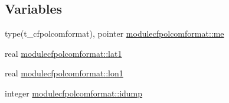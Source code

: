 \subsection*{Variables}
\begin{DoxyCompactItemize}
\item 
type(t\+\_\+cfpolcomformat), pointer \mbox{\hyperlink{namespacemodulecfpolcomformat_acc4b6f01dd43793f860ce27c79504f03}{modulecfpolcomformat\+::me}}
\item 
real \mbox{\hyperlink{namespacemodulecfpolcomformat_a85fafebe9ec21f0fc121f3b22fa92f9f}{modulecfpolcomformat\+::lat1}}
\item 
real \mbox{\hyperlink{namespacemodulecfpolcomformat_acab89e37f464dc663bc89df656d0b6e5}{modulecfpolcomformat\+::lon1}}
\item 
integer \mbox{\hyperlink{namespacemodulecfpolcomformat_a2b38a369c5d65b6539825294901a7f82}{modulecfpolcomformat\+::idump}}
\end{DoxyCompactItemize}
